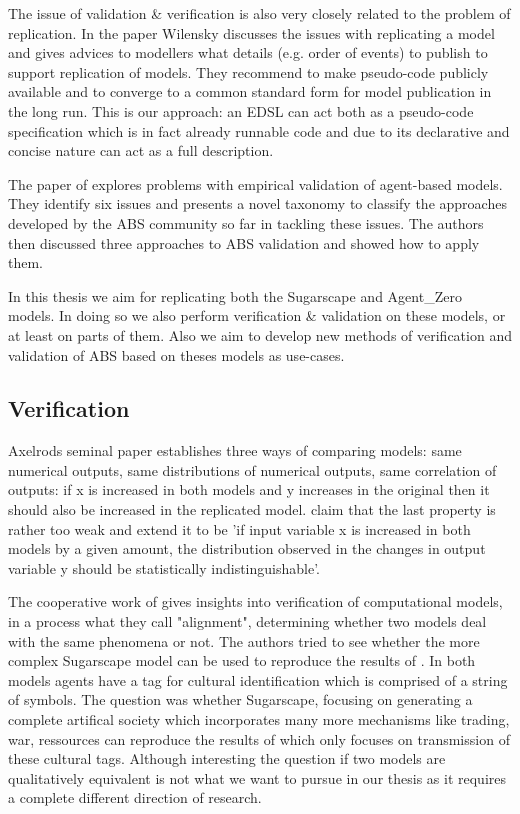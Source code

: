 The issue of validation \& verification is also very closely related to the problem of replication. In the paper \cite{wilensky_making_2007} Wilensky discusses the issues with replicating a model and gives advices to modellers what details (e.g. order of events) to publish to support replication of models. They recommend to make pseudo-code publicly available and to converge to a common standard form for model publication in the long run. This is our approach: an EDSL can act both as a pseudo-code specification which is in fact already runnable code and due to its declarative and concise nature can act as a full description.
  
The paper of \cite{windrum_empirical_2007} explores problems with empirical validation of agent-based models. They identify six issues and presents a novel taxonomy to classify the approaches developed by the ABS community so far in tackling these issues. The authors then discussed three approaches to ABS validation and showed how to apply them.

In this thesis we aim for replicating both the Sugarscape \cite{epstein_growing_1996} and Agent\_Zero \cite{epstein_agent_zero:_2014} models. In doing so we also perform verification \& validation on these models, or at least on parts of them. Also we aim to develop new methods of verification and validation of ABS based on theses models as use-cases.

\subsection{Verification}
Axelrods seminal paper \cite{axelrod_advancing_1997} establishes three ways of comparing models: same numerical outputs, same distributions of numerical outputs, same correlation of outputs: if x is increased in both models and y increases in the original then it should also be increased in the replicated model. \cite{ormerod_epistemological_2009} claim that the last property is rather too weak and extend it to be 'if input variable x is increased in both models by a given amount, the distribution observed in the changes in output variable y should be statistically indistinguishable'.

The cooperative work of \cite{axtell_aligning_1996} gives insights into verification of computational models, in a process what they call "alignment",  determining whether two models deal with the same phenomena or not. The authors tried to see whether the more complex Sugarscape model can be used to reproduce the results of \cite{axelrod_convergence_1995}. In both models agents have a tag for cultural identification which is comprised of a string of symbols. The question was whether Sugarscape, focusing on generating a complete artifical society which incorporates many more mechanisms like trading, war, ressources can reproduce the results of \cite{axelrod_convergence_1995} which only focuses on transmission of these cultural tags. Although interesting the question if two models are qualitatively equivalent is not what we want to pursue in our thesis as it requires a complete different direction of research.

